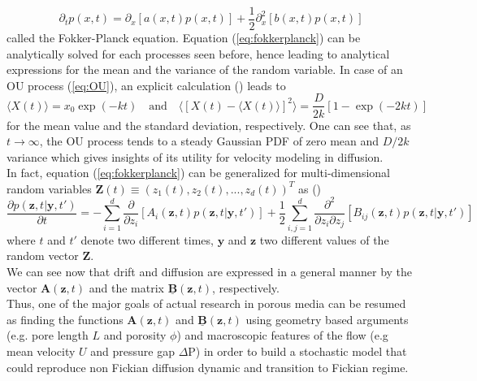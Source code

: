 \begin{equation}
\partial_t p(x,t) = \partial_x[a(x,t)p(x,t)] + \frac{1}{2}\partial^2_x [b(x,t)p(x,t)]
\label{eq:fokkerplanck} 
\end{equation}
called the Fokker-Planck equation. Equation (\ref{eq:fokkerplanck}) can be analytically solved for each processes seen before, hence leading to analytical expressions for the mean and the variance of the random variable. 
In case of an OU process (\ref{eq:OU}), an explicit calculation (\cite[Sec. 3.8.4]{Gardiner1996}) leads to
\[
\langle X(t)\rangle=x_0 \exp(-kt) \quad\textrm{and}\quad \langle[X(t)-\langle X(t)\rangle]^2\rangle=\frac{D}{2k}[1-\exp(-2kt)]
\]
for the mean value and the standard deviation, respectively. One can see that, as $t\rightarrow\infty$, the OU process tends to a steady Gaussian PDF of zero mean and $D/2k$ variance which gives insights of its utility for velocity modeling in diffusion. \\
In fact, equation (\ref{eq:fokkerplanck}) can be generalized for multi-dimensional random variables $\textbf{Z}(t)\equiv(z_1(t),z_2(t),...,z_d(t))^T$ as (\citet[Sec. 3.5.2]{Gardiner1996}) 
\begin{equation}
\frac{\partial p(\textbf{z},t|\textbf{y},t')}{\partial t} =
-\sum_{i=1}^d\frac{\partial}{\partial z_i}[A_i(\textbf{z},t)p(\textbf{z},t|\textbf{y},t')]
+ \frac{1}{2}\sum_{i,j=1}^d\frac{\partial^2 }{\partial z_i \partial z_j}[B_{ij}(\textbf{z},t)p(\textbf{z},t|\textbf{y},t')]
\label{eq:mdfp}
\end{equation}
where $t$ and $t'$ denote two different times, $\textbf{y}$ and $\textbf{z}$ two different values of the random vector $\textbf{Z}$.\\ 
We can see now that drift and diffusion are expressed in a general manner by the vector $\textbf{A}(\textbf{z},t)$ and the matrix $\underline{\textbf{B}}(\textbf{z},t)$, respectively.\\
Thus, one of the major goals of actual research in porous media can be resumed as finding the functions $\textbf{A}(\textbf{z},t)$ and $\underline{\textbf{B}}(\textbf{z},t)$ using geometry based arguments (e.g. pore length $L$ and porosity $\phi$) and macroscopic features of the flow (e.g mean velocity $U$ and pressure gap $\Delta\textrm{P}$) in order to build a stochastic model that could reproduce non Fickian diffusion dynamic and transition to Fickian regime.\\

